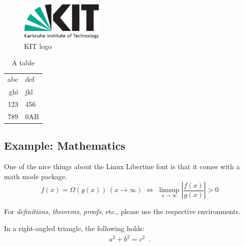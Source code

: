 \begin{figure}
  \centering
  \includegraphics[width=4cm]{logos/kitlogo_en_cmyk}
  \caption{KIT logo}
  \label{fig:kitlogo}
\end{figure}

\begin{table}
  \centering
  \begin{tabular}{r l}
    \toprule
    abc & def \\
    ghi & jkl \\
    \midrule
    123 & 456 \\
    789 & 0AB \\
    \bottomrule
  \end{tabular}
  \caption{A table}
  \label{tab:atable}
\end{table}

\subsection{Example: Mathematics}
One of the nice things about the Linux Libertine font is that it comes with
a math mode package.
\begin{displaymath}
  f(x)=\Omega(g(x))\ (x\rightarrow\infty)\;\Leftrightarrow\;
  \limsup_{x \to \infty} \left|\frac{f(x)}{g(x)}\right|> 0
\end{displaymath}

For \emph{definitions}, \emph{theorems}, \emph{proofs}, etc., please use
the respective environments.

\begin{theorem}
  In a right-angled triangle, the following holds:
  \begin{align*}
    a^{2}+b^{2}=c^{2}\enspace.
  \end{align*}

\end{theorem}

